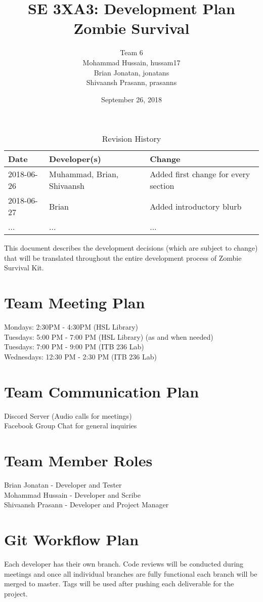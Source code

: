 \documentclass{article}
\title{SE 3XA3: Development Plan\\Zombie Survival}
\author{Team 6
		\\ Mohammad Hussain, hussam17
		\\ Brian Jonatan,  jonatans
		\\ Shivaansh Prasann, prasanns
}
\date{September 26, 2018}
\begin{document}
\begin{table}[hp]
\caption{Revision History} \label{TblRevisionHistory}
\begin{tabularx}{\textwidth}{llX}
\toprule
\textbf{Date} & \textbf{Developer(s)} & \textbf{Change}\\
\midrule
2018-06-26 & Muhammad, Brian, Shivaansh & Added first change for every section\\
2018-06-27 & Brian & Added introductory blurb\\
... & ... & ...\\
\bottomrule
\end{tabularx}
\end{table}

\newpage

\maketitle

This document describes the development decisions (which are subject to change) that will be translated throughout the entire development process of Zombie Survival Kit.

\section{Team Meeting Plan}
Mondays: 2:30PM - 4:30PM (HSL Library)\\
Tuesdays: 5:00 PM - 7:00 PM (HSL Library) (as and when needed)\\
Tuesdays: 7:00 PM - 9:00 PM (ITB 236 Lab)\\
Wednesdays: 12:30 PM - 2:30 PM (ITB 236 Lab)

\section{Team Communication Plan}
Discord Server (Audio calls for meetings)\\
Facebook Group Chat for general inquiries

\section{Team Member Roles}
Brian Jonatan - Developer and Tester\\
Mohammad Hussain - Developer and Scribe\\
Shivaansh Prasann - Developer and Project Manager

\section{Git Workflow Plan}
Each developer has their own branch. Code reviews will be conducted during meetings and once all individual branches are fully functional each branch will be merged to master. Tags will be used after pushing each deliverable for the project.
\end{document}
